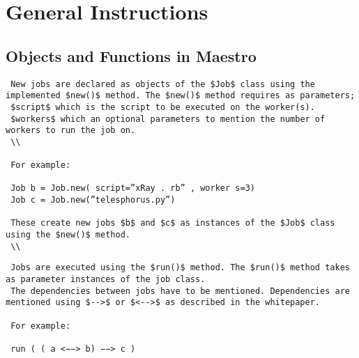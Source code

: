 \section{General Instructions}
\label{sect:general}

\subsection*{Objects and Functions in Maestro}
\begin{lstlisting}
 New jobs are declared as objects of the $Job$ class using the implemented $new()$ method. The $new()$ method requires as parameters;
 $script$ which is the script to be executed on the worker(s).
 $workers$ which an optional parameters to mention the number of workers to run the job on.
 \\

 For example:
 
 Job b = Job.new( script=”xRay . rb” , worker s=3)
 Job c = Job.new(”telesphorus.py”)

 These create new jobs $b$ and $c$ as instances of the $Job$ class using the $new()$ method.
 \\
\end{lstlisting} 


\begin{lstlisting}
 Jobs are executed using the $run()$ method. The $run()$ method takes as parameter instances of the job class.
 The dependencies between jobs have to be mentioned. Dependencies are mentioned using $-->$ or $<-->$ as described in the whitepaper.

 For example:

 run ( ( a <−−> b) −−> c )
\end{lstlisting} 

